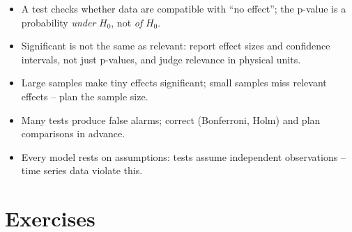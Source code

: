 \documentclass[
  letterpaper,
  DIV=11,
  numbers=noendperiod]{scrreprt}
\providecommand{\tightlist}{%
  \setlength{\itemsep}{0pt}\setlength{\parskip}{0pt}}\usepackage{longtable,booktabs,array}
\begin{document}
\begin{tcolorbox}[enhanced jigsaw, left=2mm, title=\textcolor{quarto-callout-important-color}{\faExclamation}\hspace{0.5em}{Key takeaways}, opacityback=0, breakable, rightrule=.15mm, arc=.35mm, toptitle=1mm, colbacktitle=quarto-callout-important-color!10!white, opacitybacktitle=0.6, coltitle=black, colframe=quarto-callout-important-color-frame, bottomrule=.15mm, leftrule=.75mm, bottomtitle=1mm, titlerule=0mm, toprule=.15mm, colback=white]

\begin{itemize}
\tightlist
\item
  A test checks whether data are compatible with ``no effect''; the
  p-value is a probability \emph{under} \(H_0\), not \emph{of} \(H_0\).
\item
  Significant is not the same as relevant: report effect sizes and
  confidence intervals, not just p-values, and judge relevance in
  physical units.
\item
  Large samples make tiny effects significant; small samples miss
  relevant effects -- plan the sample size.
\item
  Many tests produce false alarms; correct (Bonferroni, Holm) and plan
  comparisons in advance.
\item
  Every model rests on assumptions: tests assume independent
  observations -- time series data violate this.
\end{itemize}

\end{tcolorbox}

\section{Exercises}\label{exercises-4}
\end{document}
